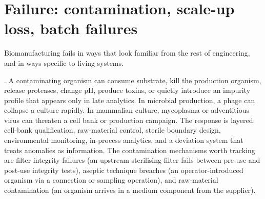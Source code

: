 \section{Failure: contamination, scale-up loss, batch failures}
\label{sec:vol06ch10:failure}

Biomanufacturing fails in ways that look familiar from the rest of
engineering, and in ways specific to living systems.



. A contaminating organism can consume substrate,
kill the production organism, release proteases, change pH, produce
toxins, or quietly introduce an impurity profile that appears only in
late analytics. In microbial production, a phage can collapse a culture
rapidly. In mammalian culture, mycoplasma or adventitious virus can
threaten a cell bank or production campaign. The response is layered:
cell-bank qualification, raw-material control, sterile boundary design,
environmental monitoring, in-process analytics, and a deviation system
that treats anomalies as information. The contamination mechanisms
worth tracking are filter integrity failures (an upstream sterilising
filter fails between pre-use and post-use integrity tests), aseptic
technique breaches (an operator-introduced organism via a connection
or sampling operation), and raw-material contamination (an organism
arrives in a medium component from the supplier).

